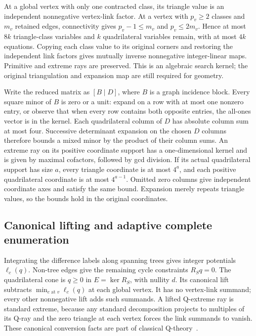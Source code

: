 At a global vertex with only one contracted class, its triangle value is
an independent nonnegative vertex-link factor. At a vertex with $p_v\ge2$
classes and $m_v$ retained edges, connectivity gives $p_v-1\le m_v$ and
$p_v\le2m_v$. Hence at most $8k$ triangle-class variables and $k$
quadrilateral variables remain, with at most $4k$ equations. Copying each
class value to its original corners and restoring the independent link
factors gives mutually inverse nonnegative integer-linear maps. Primitive
and extreme rays are preserved. This is an algebraic search kernel; the
original triangulation and expansion map are still required for geometry.

Write the reduced matrix as $[B\mid D]$, where $B$ is a graph incidence
block. Every square minor of $B$ is zero or a unit: expand on a row with
at most one nonzero entry, or observe that when every row contains both
opposite entries, the all-ones vector is in the kernel. Each quadrilateral
column of $D$ has absolute column sum at most four. Successive determinant
expansion on the chosen $D$ columns therefore bounds a mixed minor by the
product of their column sums. An extreme ray on its positive coordinate
support has a one-dimensional kernel and is given by maximal cofactors,
followed by gcd division. If its actual quadrilateral support has size $a$,
every triangle coordinate is at most $4^a$, and each positive quadrilateral
coordinate is at most $4^{a-1}$. Omitted zero columns give independent
coordinate axes and satisfy the same bound. Expansion merely repeats
triangle values, so the bounds hold in the original coordinates.

\subsection{Canonical lifting and adaptive complete enumeration}

Integrating the difference labels along spanning trees gives integer
potentials $\ell_c(q)$. Non-tree edges give the remaining cycle constraints
$R_Sq=0$. The quadrilateral cone is $q\ge0$ in $E=\ker R_S$, with nullity
$d$. Its canonical lift subtracts $\min_{c\text{ at }v}\ell_c(q)$ at each
global vertex. It has no vertex-link summand; every other nonnegative lift
adds such summands. A lifted Q-extreme ray is standard extreme, because any
standard decomposition projects to multiples of its Q-ray and the zero
triangle at each vertex forces the link summands to vanish. These canonical
conversion facts are part of classical Q-theory~\cite{burton-convert}.

